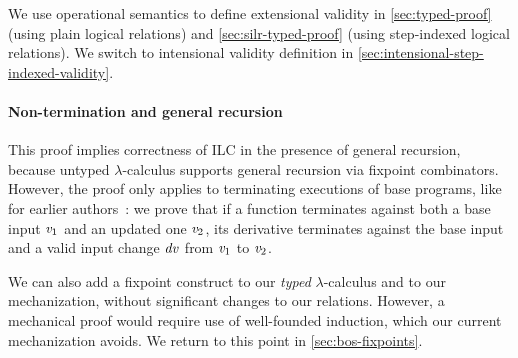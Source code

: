 We use operational semantics to define extensional validity in
\cref{sec:typed-proof} (using plain logical relations) and
\cref{sec:silr-typed-proof} (using step-indexed logical
relations). We switch to intensional validity definition in
\cref{sec:intensional-step-indexed-validity}.




\paragraph{Non-termination and general recursion}
This proof implies correctness of ILC in the presence of general recursion,
because untyped $\lambda$-calculus supports general recursion via
fixpoint combinators. However, the proof only applies to
terminating executions of base programs, like for earlier
authors~\citep*{Acar08}: we prove that if a function terminates
against both a base input \ensuremath{\Varid{v}_{1}} and an updated one \ensuremath{\Varid{v}_{2}}, its derivative
terminates against the base input and a valid input change \ensuremath{\Varid{dv}}
from \ensuremath{\Varid{v}_{1}} to \ensuremath{\Varid{v}_{2}}.

We can also add a fixpoint construct to
our \emph{typed} $\lambda$-calculus and to our mechanization,
without significant changes to our relations. However, a
mechanical proof would require use of well-founded induction,
which our current mechanization avoids.
We return to this point in \cref{sec:bos-fixpoints}.


